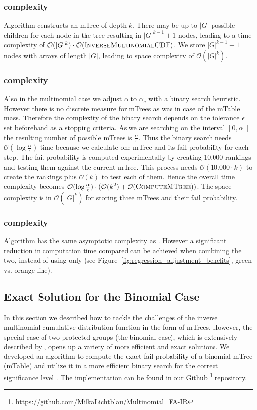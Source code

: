 \subsubsection{\algoComputeMTree complexity}\label{subsubsec:mtree-complexity}
Algorithm \algoComputeMTree constructs an mTree of depth $k$.
%
There may be up to $|G|$ possible children for each node in the tree resulting in $|G|^{k-1} +1$ nodes, leading to a time complexity of $\mathcal{O}(|G|^{k}) \cdot \mathcal{O}(\text{{\sc InverseMultinomialCDF}})$.
%
We store $|G|^{k-1} +1$ nodes with arrays of length $|G|$, leading to space complexity of $\mathcal{O}(|G|^{k})$.
%
\subsubsection{\algoMultBinary complexity}\label{subsubsec:multBinary-complexity}
Also in the multinomial case we adjust $\alpha$ to $\alpha_c$ with a binary search heuristic.
%
However there is no discrete measure for mTrees as was in case of the mTable mass.
%
Therefore the complexity of the binary search depends on the tolerance $\epsilon$ set beforehand as a stopping criteria.
%
As we are searching on the interval $\left[0,\alpha\right[$ the resulting number of possible mTrees is $\frac{\alpha}{\epsilon}$.
%
Thus the binary search needs $\mathcal{O}(\log{}\frac{\alpha}{\epsilon})$ time because we calculate one mTree and its fail probability for each step.
%
The fail probability is computed experimentally by creating 10.000 rankings and testing them against the current mTree.
%
This process needs $\mathcal{O}(10.000 \cdot k)$ to create the rankings plus $\mathcal{O}(k)$ to test each of them.
%
Hence the overall time complexity becomes $\mathcal{O}(\log{}\frac{\alpha}{\epsilon}) \cdot (\mathcal{O}(k^2) + \mathcal{O}(\text{{\sc ComputeMTree}}))$.
%
The space complexity is in $\mathcal{O}(|G|^k)$ for storing three mTrees and their fail probability.
%
\subsubsection{\algoReg complexity}\label{subsubsec:regression-complexity}
Algorithm \algoReg has the same asymptotic complexity as \algoMultBinary.
%
However a significant reduction in computation time compared can be achieved when combining the two, instead of using \algoMultBinary only (see Figure~\ref{fig:regression_adjustment_benefits}, green vs. orange line).
%
\subsection{Exact Solution for the Binomial Case}
In this section we described how to tackle the challenges of the inverse multinomial cumulative distribution function in the form of mTrees. However, the special case of two protected groups (the binomial case), which is extensively described by \citet{zehlike2017fair}, opens up a variety of more efficient and exact solutions. We developed an algorithm to compute the exact fail probability of a binomial mTree (mTable) and utilize it in a more efficient binary search for the correct significance level \cite{zehlike2020note}. The implementation can be found in our Github \footnote{\url{https://github.com/MilkaLichtblau/Multinomial_FA-IR}} repository.
